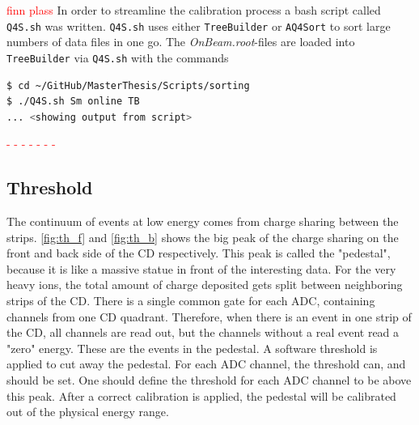 \documentclass[twoside,english]{uiofysmaster/uiofysmaster}
\let\orgautoref\autoref
\renewcommand{\autoref}
        {%
		 \def\sectionautorefname{Section}%
		 \def\subsectionautorefname{Section}%
		 \def\subsubsectionautorefname{Section}%
		 \def\chapterautorefname{Chapter}%
          \orgautoref}
\begin{document}
\textcolor{red}{finn plass}\newline
In order to streamline the calibration process a bash script called \texttt{Q4S.sh} was written. 
\texttt{Q4S.sh} uses either \texttt{TreeBuilder} or \texttt{AQ4Sort} to sort large numbers of data files in one go.
The \textit{OnBeam.root}-files are loaded into \texttt{TreeBuilder} via \texttt{Q4S.sh} with the commands
\begin{lstlisting}[language=sh]
$ cd ~/GitHub/MasterThesis/Scripts/sorting 
$ ./Q4S.sh Sm online TB
... <showing output from script>
\end{lstlisting}
\textcolor{red}{ - - - - - - - }


\subsection{Threshold}\label{ssec:threshold}
The continuum of events at low energy comes from charge sharing between the strips.
\autoref{fig:th_f} and \autoref{fig:th_b} shows the big peak of the charge sharing on the front and back side of the CD respectively. 
This peak is called the "pedestal", because it is like a massive statue in front of the interesting data. 
For the very heavy ions, the total amount of charge deposited gets split between neighboring strips of the CD. 
There is a single common gate for each ADC, containing channels from one CD quadrant. 
Therefore, when there is an event in one strip of the CD, all channels are read out, but the channels without a real event read a "zero" energy.
These are the events in the pedestal.
A software threshold is applied to cut away the pedestal. 
For each ADC channel, the threshold can, and should be set. 
One should define the threshold for each ADC channel to be above this peak.
After a correct calibration is applied, the pedestal will be calibrated out of the physical energy range.
\end{document}

